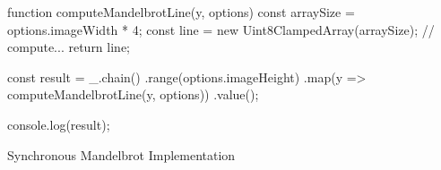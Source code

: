 \begin{listing}
	
	\begin{javascriptcode}
function computeMandelbrotLine(y, options) {
	const arraySize = options.imageWidth * 4;
	const line = new Uint8ClampedArray(arraySize);
	// compute...
	return line;
}

const result = _.chain()
	.range(options.imageHeight)
	.map(y => computeMandelbrotLine(y, options))
	.value();
	
console.log(result);
\end{javascriptcode}
\caption{Synchronous Mandelbrot Implementation}
\label{fig:mandelbrot-sync}
\end{listing}